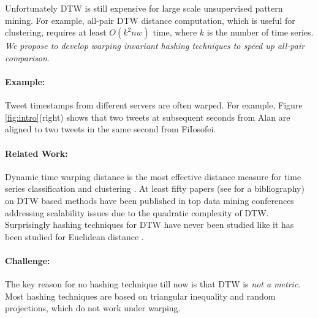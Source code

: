 Unfortunately DTW is still expensive for large scale unsupervised pattern mining. For example, all-pair DTW distance computation, which is useful for clustering, requires at least $O(k^2nw)$ time, where $k$ is the number of time series. {\it We propose to develop warping invariant hashing techniques to speed up all-pair comparison}.





\paragraph{Example:}

Tweet timestamps from different servers are often warped. For example, Figure \ref{fig:intro}(right) shows that two tweets at subsequent seconds from Alan are aligned to two tweets in the same second from FiIosofei.

\paragraph{Related Work:}

Dynamic time warping distance is the most effective distance measure for time series classification and clustering \cite{UCRArchive}. At least fifty papers (see \cite{mypage} for a bibliography) on DTW based methods have been published in top data mining conferences addressing scalability issues due to the quadratic complexity of DTW. Surprisingly hashing techniques for DTW have never been studied like it has been studied for Euclidean distance \cite{Datar2004}.


\paragraph{Challenge:}

The key reason for no hashing technique till now is that DTW is {\it not a metric}. Most hashing techniques are based on triangular inequality and random projections, which do not work under warping. 


